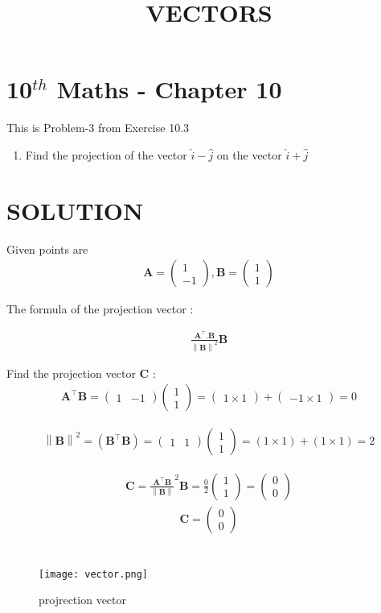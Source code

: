 \documentclass[12pt]{article}
\newcommand{\myvec}[1]{\ensuremath{\begin{pmatrix}#1\end{pmatrix}}}
\providecommand{\norm}[1]{\left\lVert#1\right\rVert}
\let\vec\mathbf
\begin{document}
\begin{center}
\title{\textbf{VECTORS}}
\date{\vspace{-5ex}} %
\maketitle
\end{center}

\setcounter{page}{1}

\section{10$^{th}$ Maths - Chapter 10}

This is Problem-3 from Exercise 10.3

\begin{enumerate}
\item Find the projection of the vector $\hat{i}-\hat{j}$ on the vector $\hat{i}+\hat{j}$  
\end{enumerate}
\section{SOLUTION}
Given points are
\begin{align}
 \vec{A}=\myvec{1\\ -1} ,
 \vec{B}=\myvec{1\\ 1}
\end{align}

The formula of the projection vector :
 
\begin{align}
	\frac{\vec{A}^\top.\vec{B}}{\norm{\vec{B}}^2} \vec{B}
\end{align}

Find the projection vector $\vec{C}$ :
\begin{align}
	\vec{A}^\top \vec{B} = \myvec{1 &-1} \myvec{1\\ 1}=\myvec{1 \times 1}+\myvec{-1 \times 1}=0
\end{align}

\begin{align}
	\norm {\vec {B}}^2 = (\vec{B}^\top  \vec{B})=\myvec{1 & 1} \myvec{1\\ 1}= (1 \times 1)+(1 \times 1)=2
\end{align}

\begin{align}
\vec{C} = 
	\frac{\vec{A}^\top  \vec{B}}{\norm {\vec{B}}}^2 \vec{B}
   =\frac{0}{2} \myvec{1\\ 1}
	=\myvec{0\\ 0}
\end{align}
\begin{align}
	\vec{C}=\myvec{0\\ 0}
\end{align}
\section{}
\begin{figure}[h]
  \centering
  \texttt{[image: vector.png]}
\caption{projrection vector}
\end{figure}
\end{document}
